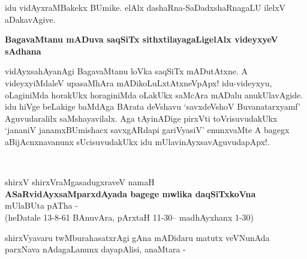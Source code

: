 idu vidAyxraMBakekx BUmike. elAlx dashaRna-SaDadxshaRnagaLU ilelxV aDakavAgive.

{\bigskip
\noindent
{\large\bf BagavaMtanu mADuva saqSiTx sithxtilayagaLigelAlx videyxyeV sAdhana}}\label{page101}
\medskip

\noindent
vidAyxsahAyanAgi BagavaMtanu loVka saqSiTx mADutAtxne. A videyxyiMdaleV upasaMhAra mADi\-koLuLx\-tAtxneVpApx! idu-videyxyu, oLaginiMda horakUkx horaginiMda oLakUkx saMcAra mADalu anu\-kUla\-vAgide. idu hiVge beLakige baMdAga BArata deVshavu `savxdeVshoV Buvanatarxyamf' Aguvudaralilx saMshaya\-vilalx. Aga tAyinADige pirxVti toVrisuvudakUkx `jananiV janamxBUmishacx savxgARdapi gariVyasiV'\label{101} enunxvaMte A bagegx aBijAcnxnavanunx sUcisuvudakUkx idu mUlavinAyxsavAguvudapApx!.

\newpage

~\phantom{a}

\bigskip

\begin{center}
shirxV shirxVraMgasadugxraveV namaH\\[.15cm]
{\Large\textbf{ASaRvidAyxsaMparxdAyada bagege mwlika daqSiTxkoVna}}\\[.15cm]
mUlaBUta pATha -\\[.15cm]
(heDatale 13-8-61 BAnuvAra, pArxtaH 11-30-- madhAyxhanx 1-30)
\end{center}

\medskip
\noindent
shirxVyavaru twMburahasatxrAgi gAna mADidaru matutx veVNunAda parxNava nAdagaLanunx dayapAlisi, anaMtara -


